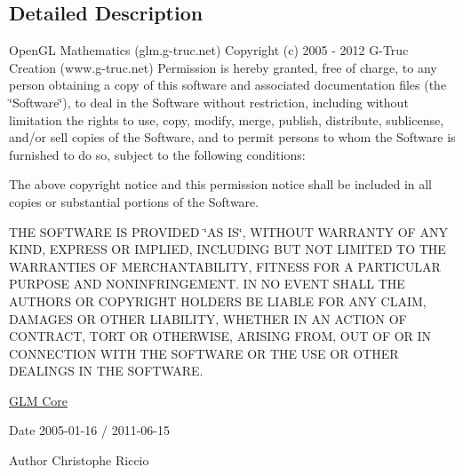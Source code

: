 \subsection{Detailed Description}
Open\-G\-L Mathematics (glm.\-g-\/truc.\-net) Copyright (c) 2005 -\/ 2012 G-\/\-Truc Creation (www.\-g-\/truc.\-net) Permission is hereby granted, free of charge, to any person obtaining a copy of this software and associated documentation files (the \char`\"{}\-Software\char`\"{}), to deal in the Software without restriction, including without limitation the rights to use, copy, modify, merge, publish, distribute, sublicense, and/or sell copies of the Software, and to permit persons to whom the Software is furnished to do so, subject to the following conditions\-:

The above copyright notice and this permission notice shall be included in all copies or substantial portions of the Software.

T\-H\-E S\-O\-F\-T\-W\-A\-R\-E I\-S P\-R\-O\-V\-I\-D\-E\-D \char`\"{}\-A\-S I\-S\char`\"{}, W\-I\-T\-H\-O\-U\-T W\-A\-R\-R\-A\-N\-T\-Y O\-F A\-N\-Y K\-I\-N\-D, E\-X\-P\-R\-E\-S\-S O\-R I\-M\-P\-L\-I\-E\-D, I\-N\-C\-L\-U\-D\-I\-N\-G B\-U\-T N\-O\-T L\-I\-M\-I\-T\-E\-D T\-O T\-H\-E W\-A\-R\-R\-A\-N\-T\-I\-E\-S O\-F M\-E\-R\-C\-H\-A\-N\-T\-A\-B\-I\-L\-I\-T\-Y, F\-I\-T\-N\-E\-S\-S F\-O\-R A P\-A\-R\-T\-I\-C\-U\-L\-A\-R P\-U\-R\-P\-O\-S\-E A\-N\-D N\-O\-N\-I\-N\-F\-R\-I\-N\-G\-E\-M\-E\-N\-T. I\-N N\-O E\-V\-E\-N\-T S\-H\-A\-L\-L T\-H\-E A\-U\-T\-H\-O\-R\-S O\-R C\-O\-P\-Y\-R\-I\-G\-H\-T H\-O\-L\-D\-E\-R\-S B\-E L\-I\-A\-B\-L\-E F\-O\-R A\-N\-Y C\-L\-A\-I\-M, D\-A\-M\-A\-G\-E\-S O\-R O\-T\-H\-E\-R L\-I\-A\-B\-I\-L\-I\-T\-Y, W\-H\-E\-T\-H\-E\-R I\-N A\-N A\-C\-T\-I\-O\-N O\-F C\-O\-N\-T\-R\-A\-C\-T, T\-O\-R\-T O\-R O\-T\-H\-E\-R\-W\-I\-S\-E, A\-R\-I\-S\-I\-N\-G F\-R\-O\-M, O\-U\-T O\-F O\-R I\-N C\-O\-N\-N\-E\-C\-T\-I\-O\-N W\-I\-T\-H T\-H\-E S\-O\-F\-T\-W\-A\-R\-E O\-R T\-H\-E U\-S\-E O\-R O\-T\-H\-E\-R D\-E\-A\-L\-I\-N\-G\-S I\-N T\-H\-E S\-O\-F\-T\-W\-A\-R\-E.

\hyperlink{group__core}{G\-L\-M Core}

\begin{DoxyDate}{Date}
2005-\/01-\/16 / 2011-\/06-\/15 
\end{DoxyDate}
\begin{DoxyAuthor}{Author}
Christophe Riccio 
\end{DoxyAuthor}
